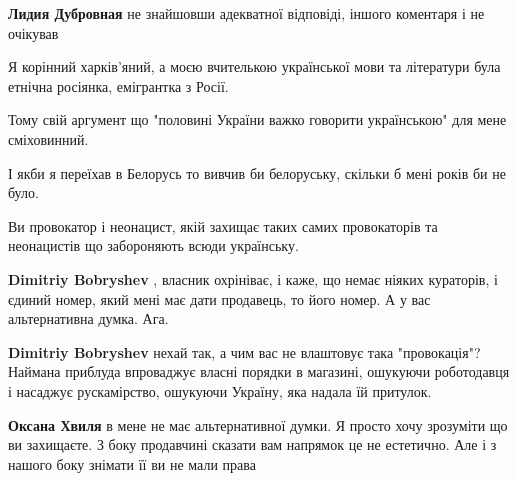 \begin{itemize}
\begin{itemize}
\textbf{Лидия Дубровная} не знайшовши адекватної відповіді, іншого коментаря і не очікував

 

Я корінний харків'яний, а моєю вчителькою української мови та літератури була
етнічна росіянка, емігрантка з Росії.

Тому свій аргумент що "половині України важко говорити українською" для мене
сміховинний.

І якби я переїхав в Белорусь то вивчив би белоруську, скільки б мені років би
не було.

Ви провокатор і неонацист, якій захищає таких самих провокаторів та неонацистів
що забороняють всюди українську.

 
\textbf{Dimitriy Bobryshev} , власник охрініває, і каже, що немає ніяких
кураторів, і єдиний номер, який мені має дати продавець, то його номер. А у вас
альтернативна думка. Ага.

 
\textbf{Dimitriy Bobryshev} нехай так, а чим вас не влаштовує така
"провокація"? Наймана приблуда впроваджує власні порядки в магазині, ошукуючи
роботодавця і насаджує рускамірство, ошукуючи Україну, яка надала їй притулок.

 
\textbf{Оксана Хвиля} в мене не має альтернативної думки. Я просто хочу
зрозуміти що ви захищаєте. З боку продавчині сказати вам напрямок це не
естетично. Але і з нашого боку знімати її ви не мали права


\end{itemize}
\end{itemize}
